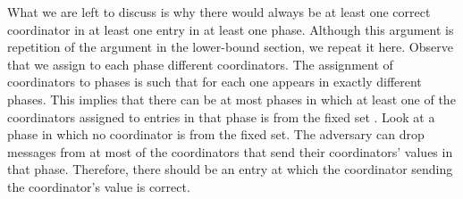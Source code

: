 \documentclass[11pt]{article}
\begin{document}
What we are left  to discuss is why there would always be at least one correct coordinator in at least one entry in at least one phase. 
Although this argument is repetition of the argument in the lower-bound section, we repeat it here.  Observe that we assign to each phase    different coordinators.
The assignment of  coordinators to phases is such that for  each one appears in exactly  different phases.  This implies that there can be at most  phases in which at least one of the coordinators assigned to entries in that phase is from the fixed set .  Look at a phase in which no coordinator is from the fixed set.  The adversary can drop messages from at most  of the coordinators that send their coordinators' values in that phase.  Therefore, there should be an entry at which the coordinator sending the coordinator's value is correct.
\end{document}

